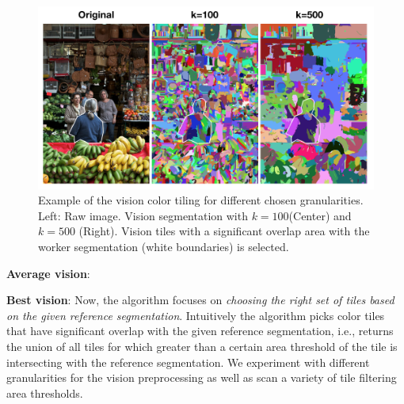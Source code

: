 \begin{figure}
\centering
\includegraphics[width=0.9\linewidth]{plots/vision_tiles.png}
\caption{Example of the vision color tiling for different chosen granularities. Left: Raw image. Vision segmentation with $k=100$(Center) and $k=500$ (Right). Vision tiles with a significant overlap area with the worker segmentation (white boundaries) is selected.}
\label{vision_example}
\end{figure}

\par \noindent\textbf{Average vision}: 
\par \noindent\textbf{Best vision}: 
Now, the algorithm focuses on {\em choosing the right set of tiles based on the given reference segmentation}. 
Intuitively the algorithm picks color tiles that have significant overlap with the given reference segmentation, i.e., returns the union of all tiles for which greater than a certain area threshold of the tile is intersecting with the reference segmentation. We experiment with different granularities for the vision preprocessing as well as scan a variety of tile filtering area thresholds. 